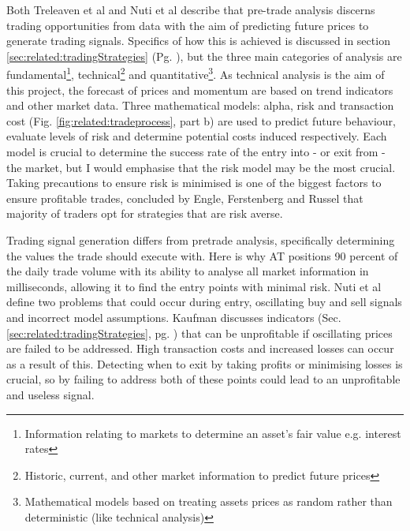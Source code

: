 Both Treleaven et al \cite{ART:Treleaven:2013} and Nuti et al \cite{ART:Nuti:2011} describe that pre-trade analysis discerns trading opportunities from data with the aim of predicting future prices to generate trading signals. Specifics of how this is achieved is discussed in section \ref{sec:related:tradingStrategies} (Pg. \pageref{sec:related:tradingStrategies}), but the three main categories of analysis are fundamental\footnote{Information relating to markets to determine an asset's fair value e.g. interest rates}, technical\footnote{Historic, current, and other market information to predict future prices} and quantitative\footnote{Mathematical models based on treating assets prices as random rather than deterministic (like technical analysis)}. As technical analysis is the aim of this project, the forecast of prices and momentum are based on trend indicators and other market data. Three mathematical models: alpha, risk and transaction cost (Fig. \ref{fig:related:tradeprocess}, part b) are used to predict future behaviour, evaluate levels of risk and determine potential costs induced respectively. Each model is crucial to determine the success rate of the entry into - or exit from - the market, but I would emphasise that the risk model may be the most crucial. Taking precautions to ensure risk is minimised is one of the biggest factors to ensure profitable trades, concluded by Engle, Ferstenberg and Russel \cite{ART:Robert:2012} that majority of traders opt for strategies that are risk averse.

Trading signal generation differs from pretrade analysis, specifically determining the values the trade should execute with. Here is why AT positions 90 percent of the daily trade volume \cite{WEB:Cheng:2017,ART:Kolakowski:2018} with its ability to analyse all market information in milliseconds, allowing it to find the entry points with minimal risk. Nuti et al \cite{ART:Nuti:2011} define two problems that could occur during entry, oscillating buy and sell signals and incorrect model assumptions.  Kaufman \cite{BOOK:Kaufman:2013} discusses indicators (Sec. \ref{sec:related:tradingStrategies}, pg. \pageref{sec:related:tradingStrategies}) that can be unprofitable if oscillating prices are failed to be addressed. High transaction costs and increased losses can occur as a result of this. Detecting when to exit by taking profits or minimising losses is crucial, so by failing to address both of these points could lead to an unprofitable and useless signal. 


